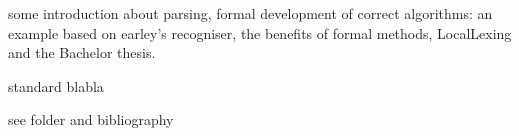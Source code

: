 %
\begin{isabellebody}%
%
%
\isadelimtheory
%
\endisadelimtheory
%
\isatagtheory
%
\endisatagtheory
{\isafoldtheory}%
%
\isadelimtheory
%
\endisadelimtheory
%
\isadelimdocument
%
\endisadelimdocument
%
\isatagdocument
%
\isamarkuptrue%
%
\endisatagdocument
{\isafolddocument}%
%
\isadelimdocument
%
\endisadelimdocument
%
\begin{isamarkuptext}%
%
\end{isamarkuptext}\isamarkuptrue%
%
\begin{isamarkuptext}%
%
\end{isamarkuptext}\isamarkuptrue%
%
\isadelimdocument
%
\endisadelimdocument
%
\isatagdocument
%
\isamarkuptrue%
%
\endisatagdocument
{\isafolddocument}%
%
\isadelimdocument
%
\endisadelimdocument
%
\begin{isamarkuptext}%
some introduction about parsing, formal development of correct algorithms: an example based on
earley's recogniser, the benefits of formal methods, LocalLexing and the Bachelor thesis.%
\end{isamarkuptext}\isamarkuptrue%
%
\isadelimdocument
%
\endisadelimdocument
%
\isatagdocument
%
\isamarkuptrue%
%
\endisatagdocument
{\isafolddocument}%
%
\isadelimdocument
%
\endisadelimdocument
%
\begin{isamarkuptext}%
standard blabla%
\end{isamarkuptext}\isamarkuptrue%
%
\isadelimdocument
%
\endisadelimdocument
%
\isatagdocument
%
\isamarkuptrue%
%
\endisatagdocument
{\isafolddocument}%
%
\isadelimdocument
%
\endisadelimdocument
%
\begin{isamarkuptext}%
see folder and bibliography%
\end{isamarkuptext}\isamarkuptrue%

\end{isabellebody}
